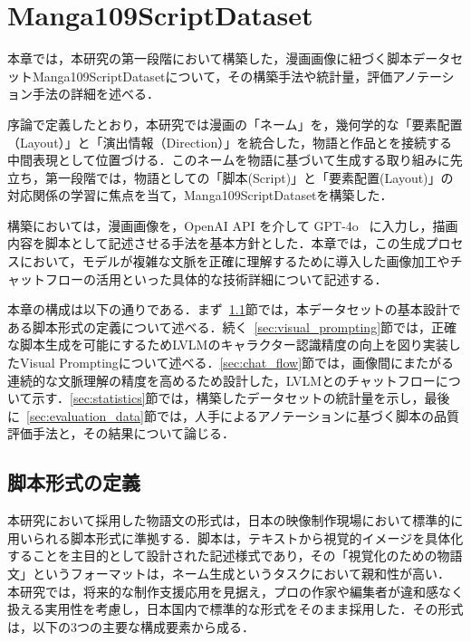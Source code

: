 \documentclass[a4j,12pt]{jsreport}
\begin{document}
\ifdefined\ismain\else
   \pagestyle{fancy}
   \lhead{\rightmark}
   \renewcommand{\chaptermark}[1]{\markboth{第\ \thechapter\ 章\ #1}{}}
   \setlength{\headheight}{16.5pt}
   \titleformat{\chapter}[hang]{\LARGE\bfseries}{\prechaptername\thechapter\postchaptername}{1em}{}
\fi



\chapter{Manga109ScriptDataset}\label{chap:manga109script}
本章では，本研究の第一段階において構築した，漫画画像に紐づく脚本データセットManga109ScriptDatasetについて，その構築手法や統計量，評価アノテーション手法の詳細を述べる．

序論で定義したとおり，本研究では漫画の「ネーム」を，幾何学的な「要素配置（Layout）」と「演出情報（Direction）」を統合した，物語と作品とを接続する中間表現として位置づける．このネームを物語に基づいて生成する取り組みに先立ち，第一段階では，物語としての「脚本(Script)」と「要素配置(Layout)」の対応関係の学習に焦点を当て，Manga109ScriptDatasetを構築した．

構築においては，漫画画像を，OpenAI API を介して GPT-4o~\cite{openai2024gpt4o} に入力し，描画内容を脚本として記述させる手法を基本方針とした．本章では，この生成プロセスにおいて，モデルが複雑な文脈を正確に理解するために導入した画像加工やチャットフローの活用といった具体的な技術詳細について記述する．

本章の構成は以下の通りである．まず~\ref{sec:script_format}節では，本データセットの基本設計である脚本形式の定義について述べる．続く~\ref{sec:visual_prompting}節では，正確な脚本生成を可能にするためLVLMのキャラクター認識精度の向上を図り実装したVisual Promptingについて述べる．\ref{sec:chat_flow}節では，画像間にまたがる連続的な文脈理解の精度を高めるため設計した，LVLMとのチャットフローについて示す．\ref{sec:statistics}節では，構築したデータセットの統計量を示し，最後に~\ref{sec:evaluation_data}節では，人手によるアノテーションに基づく脚本の品質評価手法と，その結果について論じる．

\section{脚本形式の定義}\label{sec:script_format}
本研究において採用した物語文の形式は，日本の映像制作現場において標準的に用いられる脚本形式に準拠する．脚本は，テキストから視覚的イメージを具体化することを主目的として設計された記述様式であり，その「視覚化のための物語文」というフォーマットは，ネーム生成というタスクにおいて親和性が高い．
本研究では，将来的な制作支援応用を見据え，プロの作家や編集者が違和感なく扱える実用性を考慮し，日本国内で標準的な形式をそのまま採用した．その形式は，以下の3つの主要な構成要素から成る．
\end{document}
